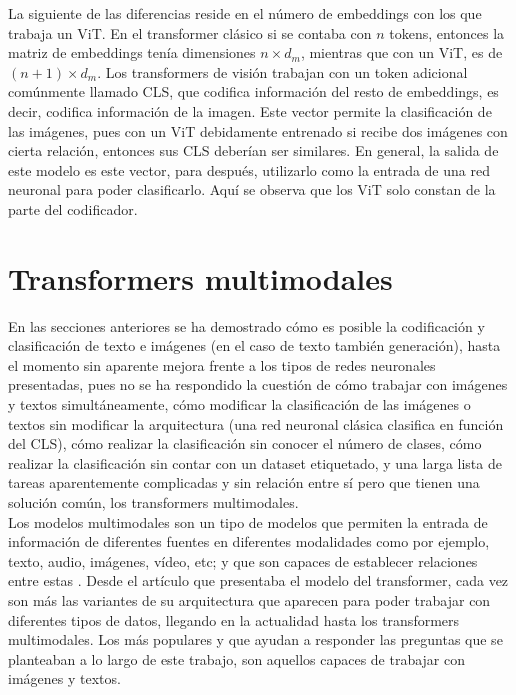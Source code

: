			La siguiente de las diferencias reside en el número de embeddings con los que trabaja un ViT. En el transformer clásico si se contaba con $n$ tokens, entonces la matriz de embeddings tenía dimensiones $n \times d_m$, mientras que con un ViT, es de $(n + 1) \times d_m$. Los transformers de visión trabajan con un token adicional comúnmente llamado CLS, que codifica información del resto de embeddings, es decir, codifica información de la imagen. Este vector permite la clasificación de las imágenes, pues con un ViT debidamente entrenado si recibe dos imágenes con cierta relación, entonces sus CLS deberían ser similares. En general, la salida de este modelo es este vector, para después, utilizarlo como la entrada de una red neuronal para poder clasificarlo. Aquí se observa que los ViT solo constan de la parte del codificador. 
			
		\section{Transformers multimodales}
		
			En las secciones anteriores se ha demostrado cómo es posible la codificación y clasificación de texto e imágenes (en el caso de texto también generación), hasta el momento sin aparente mejora frente a los tipos de redes neuronales presentadas, pues no se ha respondido la cuestión de cómo trabajar con imágenes y textos simultáneamente, cómo modificar la clasificación de las imágenes o textos sin modificar la arquitectura (una red neuronal clásica clasifica en función del CLS), cómo realizar la clasificación sin conocer el número de clases, cómo realizar la clasificación sin contar con un dataset etiquetado, y una larga lista de tareas aparentemente complicadas y sin relación entre sí pero que tienen una solución común, los transformers multimodales. \\
			
			Los modelos multimodales son un tipo de modelos que permiten la entrada de información de diferentes fuentes en diferentes modalidades como por ejemplo, texto, audio, imágenes, vídeo, etc; y que son capaces de establecer relaciones entre estas \cite{multimodal_dl}. Desde el artículo que presentaba el modelo del transformer, cada vez son más las variantes de su arquitectura que aparecen para poder trabajar con diferentes tipos de datos, llegando en la actualidad hasta los transformers multimodales. Los más populares y que ayudan a responder las preguntas que se planteaban a lo largo de este trabajo, son aquellos capaces de trabajar con imágenes y textos. \\
			
